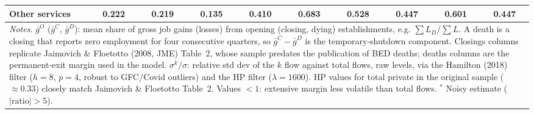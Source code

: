\begin{table}[htbp]
\begin{tabular}{lccccccccc}
Other services & 0.222 & 0.219 & 0.135 & 0.410 & 0.683 & 0.528 & 0.447 & 0.601 & 0.447 \\
\midrule
\multicolumn{10}{p{0.98\linewidth}}{\footnotesize \textit{Notes.} $\bar{g}^O$ ($\bar{g}^C$, $\bar{g}^D$): mean share of gross job gains (losses) from opening (closing, dying) establishments, e.g. $\sum L_D/\sum L$. A death is a closing that reports zero employment for four consecutive quarters, so $\bar{g}^C-\bar{g}^D$ is the temporary-shutdown component. Closings columns replicate Jaimovich \& Floetotto (2008, JME) Table~2, whose sample predates the publication of BED deaths; deaths columns are the permanent-exit margin used in the model. $\sigma^k/\sigma$: relative std dev of the $k$ flow against total flows, raw levels, via the Hamilton (2018) filter ($h{=}8$, $p{=}4$, robust to GFC/Covid outliers) and the HP filter ($\lambda{=}1600$). HP values for total private in the original sample ($\approx 0.33$) closely match Jaimovich \& Floetotto Table~2. Values $<1$: extensive margin less volatile than total flows. $^{*}$ Noisy estimate ($|\text{ratio}|>5$).} \\
\bottomrule
\end{tabular}
\end{table}
